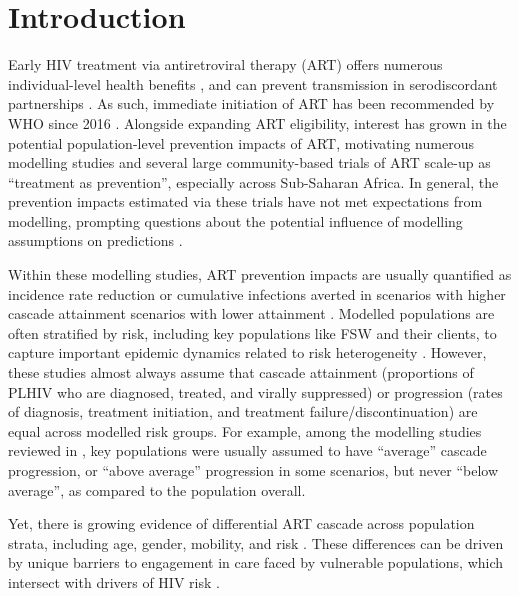 \section{Introduction}\label{intro}
Early HIV treatment via antiretroviral therapy (ART) offers
numerous individual-level health benefits \cite{Gabillard2013,Maartens2014,Danel2015,Lundgren2015init},
and can prevent transmission in serodiscordant partnerships \cite{Anglemyer2013,Cohen2016,Rodger2019}.
As such, immediate initiation of ART has been recommended by WHO since 2016 \cite{WHO2016art}.
Alongside expanding ART eligibility,
interest has grown in the potential population-level prevention impacts of ART, motivating
numerous modelling studies \cite{Granich2009,Eaton2012,Eaton2014art,Knight2022sr} and
several large community-based trials \cite{Makhema2019,Havlir2019,Hayes2019,Iwuji2018}
of ART scale-up as ``treatment as prevention'', especially across Sub-Saharan Africa.
In general, the prevention impacts estimated via these trials
have not met expectations from modelling, prompting questions about
the potential influence of modelling assumptions on predictions \cite{Baral2019}.
\par
Within these modelling studies, ART prevention impacts are usually quantified as
incidence rate reduction or cumulative infections averted
in scenarios with higher cascade attainment \vs scenarios with lower attainment \cite{Knight2022sr}.
Modelled populations are often stratified by risk,
including key populations like FSW and their clients,
to capture important epidemic dynamics related to risk heterogeneity
\cite{Stigum1994,Garnett1996,Watts2010}.
However, these studies almost always assume that cascade
attainment (\ie proportions of PLHIV who are diagnosed, treated, and virally suppressed) or
progression (\ie rates of diagnosis, treatment initiation, and treatment failure/discontinuation)
are equal across modelled risk groups.
For example, among the modelling studies reviewed in \cite{Knight2022sr},
key populations were usually assumed to have ``average'' cascade progression,
or ``above average'' progression in some scenarios, but never ``below average'',
as compared to the population overall.
\par
Yet, there is growing evidence of differential ART cascade across population strata,
including age, gender, mobility, and risk \cite{Hakim2018,Green2020}.
These differences can be driven by
unique barriers to engagement in care faced by vulnerable populations,
which intersect with drivers of HIV risk \cite{Wanyenze2016,Schwartz2017,Schmidt-Sane2022}.
